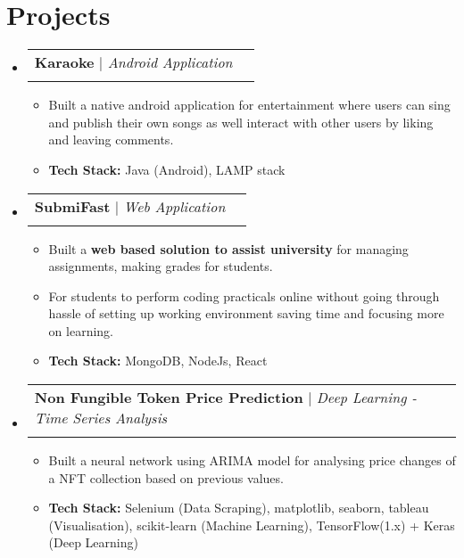 \documentclass[letterpaper,11pt, ]{article}
\makeatletter
\newcommand{\resumeItem}[1]{
  \item[\bullet]\small{
    {#1 \vspace{-2pt}}
  }
}
\newcommand{\resumeResultItem}[1]{
  \item[\checkmark]\small{
    {#1 \vspace{-2pt}}
  }
}
\newcommand{\resumeProjectHeading}[4]{
    \item
    \begin{tabular*}{1.001\textwidth}{l@{\extracolsep{\fill}}r}
      \small#1 & \textbf{\small #2}\\      
      \textit{\small#3} & \textit{\small #4}\\
    \end{tabular*}\vspace{-7pt}
}
\newcommand{\resumeSubHeadingListStart}{\begin{itemize}[leftmargin=0.0in, label={}]}
\newcommand{\resumeSubHeadingListEnd}{\end{itemize}}
\newcommand{\resumeItemListStart}{\begin{itemize}[leftmargin=10pt]}
\newcommand{\resumeItemListEnd}{\end{itemize}\vspace{-5pt}}
\makeatother
\begin{document}
\section{Projects}
    \begin{justify}

    \resumeSubHeadingListStart
    
      \resumeProjectHeading
          {\textbf{Karaoke} $|$ \emph{Android Application}}{}{}{}
          \vspace{-20pt}
          \resumeItemListStart
            
            \resumeItem{Built a native android application for entertainment where users can sing and publish their own songs as well interact with other users by liking and leaving comments. }
            \resumeResultItem{\textbf{Tech Stack:} Java (Android), LAMP stack}
          \resumeItemListEnd 
        


        \resumeProjectHeading
          {\textbf{SubmiFast} $|$ \emph{Web Application}} {}{}{}
          \vspace{-20pt}
          \resumeItemListStart
            \resumeItem{Built a \textbf{web based solution to assist university} for managing assignments, making grades for students.}
            \resumeItem{For students to perform coding practicals online without going through hassle of setting up working environment saving time and focusing more on learning. }
            
            \resumeResultItem{\textbf{Tech Stack:}{ MongoDB, NodeJs, React}}
            \resumeItemListEnd


        \resumeProjectHeading
        {\textbf{Non Fungible Token Price Prediction} $|$ \emph{Deep Learning - Time Series Analysis}}{}{}{}        
          \vspace{-20pt}
        \resumeItemListStart
            \resumeItem{Built a neural network using ARIMA model for analysing price changes of a NFT collection based on previous values.}
            
            \resumeResultItem{\textbf{Tech Stack:}{ Selenium (Data Scraping), matplotlib, seaborn, tableau (Visualisation), scikit-learn (Machine Learning), TensorFlow(1.x) + Keras (Deep Learning) }}
            \resumeItemListEnd


   
        \resumeSubHeadingListEnd
    \end{justify}

\vspace{-10pt}
\end{document}
